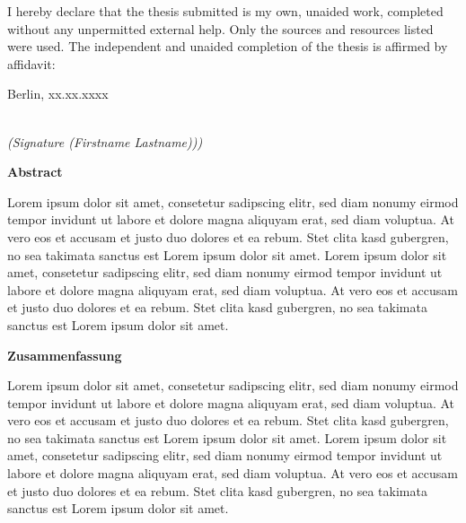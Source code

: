 \documentclass[11pt,oneside,a4paper]{book}
\begin{document}
\newpage\null\thispagestyle{empty}\newpage

\vspace*{6cm}

\noindent
I hereby declare that the thesis submitted is my own, unaided work, completed without any
unpermitted external help. Only the sources and resources listed were used.
The independent and unaided completion of the thesis is affirmed by affidavit:
\vspace{2cm}

\noindent
Berlin, xx.xx.xxxx

\vspace{3cm}

\hspace*{7cm}%
\dotfill\\
\hspace*{8.5cm}%
\textit{(Signature (Firstname Lastname)))}
\thispagestyle{empty}
\newpage\null\thispagestyle{empty}\newpage

\begin{LARGE} \centering \textbf{Abstract}\\[4ex]
\end{LARGE}

Lorem ipsum dolor sit amet, consetetur sadipscing elitr, sed diam nonumy eirmod tempor invidunt ut labore et dolore magna aliquyam erat, sed diam voluptua. At vero eos et accusam et justo duo dolores et ea rebum. Stet clita kasd gubergren, no sea takimata sanctus est Lorem ipsum dolor sit amet. Lorem ipsum dolor sit amet, consetetur sadipscing elitr, sed diam nonumy eirmod tempor invidunt ut labore et dolore magna aliquyam erat, sed diam voluptua. At vero eos et accusam et justo duo dolores et ea rebum. Stet clita kasd gubergren, no sea takimata sanctus est Lorem ipsum dolor sit amet.
\newpage\null\thispagestyle{empty}\newpage


\begin{LARGE} \centering \textbf{Zusammenfassung}\\[4ex]
\end{LARGE}

Lorem ipsum dolor sit amet, consetetur sadipscing elitr, sed diam nonumy eirmod tempor invidunt ut labore et dolore magna aliquyam erat, sed diam voluptua. At vero eos et accusam et justo duo dolores et ea rebum. Stet clita kasd gubergren, no sea takimata sanctus est Lorem ipsum dolor sit amet. Lorem ipsum dolor sit amet, consetetur sadipscing elitr, sed diam nonumy eirmod tempor invidunt ut labore et dolore magna aliquyam erat, sed diam voluptua. At vero eos et accusam et justo duo dolores et ea rebum. Stet clita kasd gubergren, no sea takimata sanctus est Lorem ipsum dolor sit amet.
\thispagestyle{empty}
\newpage\null\thispagestyle{empty}\newpage
\end{document}
